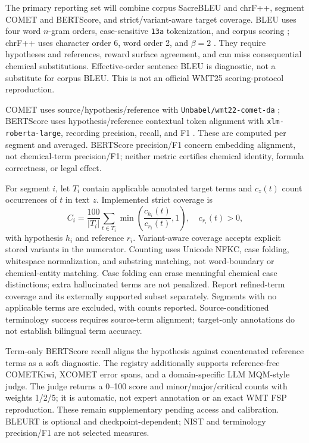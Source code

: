The primary reporting set will combine corpus SacreBLEU and chrF++, segment COMET and BERTScore,
and strict/variant-aware target coverage. BLEU uses four word $n$-gram orders, case-sensitive
\texttt{13a} tokenization, and corpus scoring \cite{papineni2002,post2018}; chrF++ uses character
order 6, word order 2, and $\beta=2$ \cite{popovic2017}. They require hypotheses and references,
reward surface agreement, and can miss consequential chemical substitutions. Effective-order
sentence BLEU is diagnostic, not a substitute for corpus BLEU. This is not an official WMT25
scoring-protocol reproduction.

COMET uses source/hypothesis/reference with \texttt{Unbabel/wmt22-comet-da} \cite{rei2020};
BERTScore uses hypothesis/reference contextual token alignment with \texttt{xlm-roberta-large},
recording precision, recall, and F1 \cite{zhang2020}. These are computed per segment and averaged.
BERTScore precision/F1 concern embedding alignment, not chemical-term precision/F1; neither
metric certifies chemical identity, formula correctness, or legal effect.

For segment $i$, let $T_i$ contain applicable annotated target terms and $c_z(t)$ count occurrences
of $t$ in text $z$. Implemented strict coverage is
\begin{equation}
 C_i=\frac{100}{|T_i|}\sum_{t\in T_i}
 \min\left(\frac{c_{h_i}(t)}{c_{r_i}(t)},1\right),\quad c_{r_i}(t)>0,
\end{equation}
with hypothesis $h_i$ and reference $r_i$. Variant-aware coverage accepts explicit stored variants
in the numerator. Counting uses Unicode NFKC, case folding, whitespace normalization, and substring
matching, not word-boundary or chemical-entity matching. Case folding can erase meaningful chemical
case distinctions; extra hallucinated terms are not penalized. Report refined-term coverage and
its externally supported subset separately. Segments with no applicable terms are excluded, with
counts reported. Source-conditioned terminology success requires source-term alignment; target-only
annotations do not establish bilingual term accuracy.

Term-only BERTScore recall aligns the hypothesis against concatenated reference terms as a soft
diagnostic. The registry additionally supports reference-free COMETKiwi, XCOMET error spans, and a
domain-specific LLM MQM-style judge. The judge returns a 0--100 score and minor/major/critical
counts with weights 1/2/5; it is automatic, not expert annotation or an exact WMT FSP reproduction.
These remain supplementary pending access and calibration. BLEURT is optional and checkpoint-dependent;
NIST and terminology precision/F1 are not selected measures.

